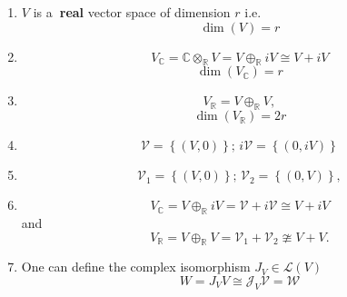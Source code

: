 \documentclass[aps,preprint]{revtex4}
\begin{document}
\begin{enumerate}
\item $V$ is a\textbf{\ real} vector space of dimension $r$ i.e.%
\begin{equation}
\dim \left( V\right) =r
\end{equation}

\item 
\begin{equation}
V_{\mathbb{C}}=\mathbb{C}\otimes _{\mathbb{R}}V=V\oplus _{\mathbb{R}}iV\cong
V+iV
\end{equation}%
\begin{equation}
\dim \left( V_{\mathbb{C}}\right) =r
\end{equation}

\item 
\begin{equation}
V_{\mathbb{R}}=V\oplus _{\mathbb{R}}V,
\end{equation}%
\begin{equation}
\dim \left( V_{\mathbb{R}}\right) =2r
\end{equation}

\item 
\begin{equation}
\mathcal{V}=\left\{ \left( V,0\right) \right\} ;\,i\mathcal{V}=\left\{
\left( 0,iV\right) \right\}
\end{equation}

\item 
\begin{equation}
\mathcal{V}_{1}=\left\{ \left( V,0\right) \right\} ;\,\mathcal{V}%
_{2}=\left\{ \left( 0,V\right) \right\} ,
\end{equation}

\item 
\begin{equation}
V_{\mathbb{C}}=V\oplus _{\mathbb{R}}iV=\mathcal{V}+i\mathcal{V}\cong V+iV
\end{equation}%
and 
\begin{equation}
V_{\mathbb{R}}=V\oplus _{\mathbb{R}}V=\mathcal{V}_{1}+\mathcal{V}_{2}\ncong
V+V.
\end{equation}

\item One can define the complex isomorphism $J_{V}\in \mathcal{L}\left(
V\right) $ 
\begin{equation}
W=J_{V}V\cong \mathcal{J}_{V}\mathcal{V}=\mathcal{W}
\end{equation}
\end{enumerate}
\end{document}
